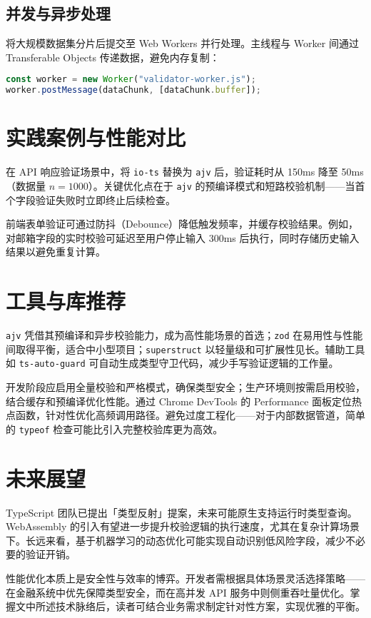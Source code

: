 \section{并发与异步处理}
将大规模数据集分片后提交至 Web Workers 并行处理。主线程与 Worker 间通过 Transferable Objects 传递数据，避免内存复制：\par
\begin{lstlisting}[language=typescript]
const worker = new Worker("validator-worker.js");
worker.postMessage(dataChunk, [dataChunk.buffer]);
\end{lstlisting}
\chapter{实践案例与性能对比}
在 API 响应验证场景中，将 \verb!io-ts! 替换为 \verb!ajv! 后，验证耗时从 150ms 降至 50ms（数据量 $n=1000$）。关键优化点在于 \verb!ajv! 的预编译模式和短路校验机制——当首个字段验证失败时立即终止后续检查。\par
前端表单验证可通过防抖（Debounce）降低触发频率，并缓存校验结果。例如，对邮箱字段的实时校验可延迟至用户停止输入 300ms 后执行，同时存储历史输入结果以避免重复计算。\par
\chapter{工具与库推荐}
\verb!ajv! 凭借其预编译和异步校验能力，成为高性能场景的首选；\verb!zod! 在易用性与性能间取得平衡，适合中小型项目；\verb!superstruct! 以轻量级和可扩展性见长。辅助工具如 \verb!ts-auto-guard! 可自动生成类型守卫代码，减少手写验证逻辑的工作量。\par
开发阶段应启用全量校验和严格模式，确保类型安全；生产环境则按需启用校验，结合缓存和预编译优化性能。通过 Chrome DevTools 的 Performance 面板定位热点函数，针对性优化高频调用路径。避免过度工程化——对于内部数据管道，简单的 \verb!typeof! 检查可能比引入完整校验库更为高效。\par
\chapter{未来展望}
TypeScript 团队已提出「类型反射」提案，未来可能原生支持运行时类型查询。WebAssembly 的引入有望进一步提升校验逻辑的执行速度，尤其在复杂计算场景下。长远来看，基于机器学习的动态优化可能实现自动识别低风险字段，减少不必要的验证开销。\par
性能优化本质上是安全性与效率的博弈。开发者需根据具体场景灵活选择策略——在金融系统中优先保障类型安全，而在高并发 API 服务中则侧重吞吐量优化。掌握文中所述技术脉络后，读者可结合业务需求制定针对性方案，实现优雅的平衡。\par
